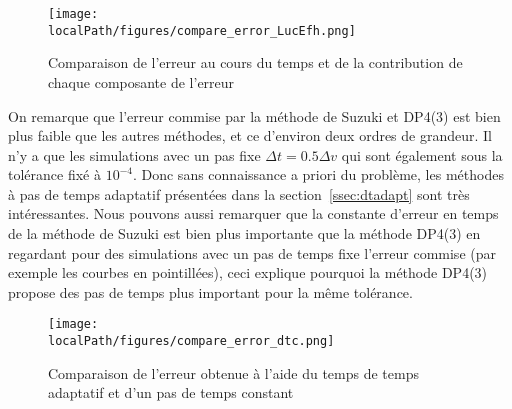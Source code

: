 \begin{figure}[h]
  \centering
  \texttt{[image: \\localPath/figures/compare\_error\_LucEfh.png]}
  \caption{Comparaison de l'erreur au cours du temps et de la contribution de chaque composante de l'erreur}
  \label{fig:compare:error:LucEfh}
\end{figure}

On remarque que l'erreur commise par la méthode de Suzuki et DP4(3) est bien plus faible que les autres méthodes, et ce d'environ deux ordres de grandeur. Il n'y a que les simulations avec un pas fixe $\Delta t = 0.5\Delta v$ qui sont également sous la tolérance  fixé \`a 
$10^{-4}$. Donc sans connaissance a priori du problème, les méthodes à pas de temps adaptatif présentées dans la section~\ref{ssec:dtadapt} sont très intéressantes. Nous pouvons aussi remarquer que la constante d'erreur en temps de la méthode de Suzuki est bien plus importante que la méthode DP4(3) en regardant pour des simulations avec un pas de temps fixe l'erreur commise (par exemple les courbes en pointillées), ceci explique pourquoi la méthode DP4(3) propose des pas de temps plus important pour la même tolérance.

\begin{figure}[h]
  \centering
  \texttt{[image: \\localPath/figures/compare\_error\_dtc.png]}
  \caption{Comparaison de l'erreur obtenue à l'aide du temps de temps adaptatif et d'un pas de temps constant}
  \label{fig:compare:error:dtc}
\end{figure}




